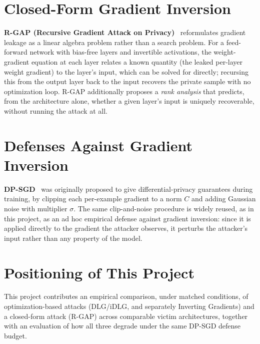 \section{Closed-Form Gradient Inversion}
\label{sec:related-closed-form}

\textbf{R-GAP (Recursive Gradient Attack on Privacy)}~\cite{zhu2021rgap}
reformulates gradient leakage as a linear algebra problem rather than a
search problem. For a feed-forward network with bias-free layers and
invertible activations, the weight-gradient equation at each layer relates
a known quantity (the leaked per-layer weight gradient) to the layer's
input, which can be solved for directly; recursing this from the output
layer back to the input recovers the private sample with no optimization
loop. R-GAP additionally proposes a \emph{rank analysis} that predicts,
from the architecture alone, whether a given layer's input is uniquely
recoverable, without running the attack at all.

\section{Defenses Against Gradient Inversion}
\label{sec:related-defenses}

\textbf{DP-SGD}~\cite{abadi2016dpsgd} was originally proposed to give
differential-privacy guarantees during training, by clipping each
per-example gradient to a norm $C$ and adding Gaussian noise with
multiplier $\sigma$. The same clip-and-noise procedure is widely reused, as
in this project, as an ad hoc empirical defense against gradient inversion:
since it is applied directly to the gradient the attacker observes, it
perturbs the attacker's input rather than any property of the model.

\section{Positioning of This Project}

This project contributes an empirical comparison, under matched conditions,
of optimization-based attacks (DLG/iDLG, and separately Inverting
Gradients) and a closed-form attack (R-GAP) across comparable victim
architectures, together with an evaluation of how all three degrade under
the same DP-SGD defense budget.

